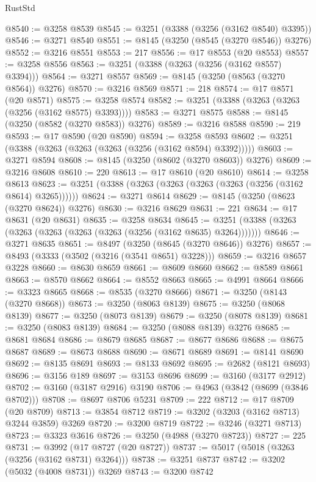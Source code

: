 \begin{lexlean}{RustStd}
\begin{coremodule}
@8540 := @3258 @8539
@8545 := @3251 (@3388 (@3256 (@3162 @8540) @3395))
@8546 := @3271 @8540
@8551 := @8145 (@3250 (@8545 (@3270 @8546)) @3276)
@8552 := @3216 @8551
@8553 := 217
@8556 := @17 @8553 (@20 @8553)
@8557 := @3258 @8556
@8563 := @3251 (@3388 (@3263 (@3256 (@3162 @8557) @3394)))
@8564 := @3271 @8557
@8569 := @8145 (@3250 (@8563 (@3270 @8564)) @3276)
@8570 := @3216 @8569
@8571 := 218
@8574 := @17 @8571 (@20 @8571)
@8575 := @3258 @8574
@8582 := @3251 (@3388 (@3263 (@3263 (@3256 (@3162 @8575) @3393))))
@8583 := @3271 @8575
@8588 := @8145 (@3250 (@8582 (@3270 @8583)) @3276)
@8589 := @3216 @8588
@8590 := 219
@8593 := @17 @8590 (@20 @8590)
@8594 := @3258 @8593
@8602 := @3251 (@3388 (@3263 (@3263 (@3263 (@3256 (@3162 @8594) @3392)))))
@8603 := @3271 @8594
@8608 := @8145 (@3250 (@8602 (@3270 @8603)) @3276)
@8609 := @3216 @8608
@8610 := 220
@8613 := @17 @8610 (@20 @8610)
@8614 := @3258 @8613
@8623 := @3251 (@3388 (@3263 (@3263 (@3263 (@3263 (@3256 (@3162 @8614) @3265))))))
@8624 := @3271 @8614
@8629 := @8145 (@3250 (@8623 (@3270 @8624)) @3276)
@8630 := @3216 @8629
@8631 := 221
@8634 := @17 @8631 (@20 @8631)
@8635 := @3258 @8634
@8645 := @3251 (@3388 (@3263 (@3263 (@3263 (@3263 (@3263 (@3256 (@3162 @8635) @3264)))))))
@8646 := @3271 @8635
@8651 := @8497 (@3250 (@8645 (@3270 @8646)) @3276)
@8657 := @8493 (@3333 (@3502 (@3216 (@3541 @8651) @3228)))
@8659 := @3216 @8657 @3228
@8660 := @8630 @8659
@8661 := @8609 @8660
@8662 := @8589 @8661
@8663 := @8570 @8662
@8664 := @8552 @8663
@8665 := @4991 @8664
@8666 := @3323 @8665
@8668 := @8535 (@3270 @8666)
@8671 := @3250 (@8143 (@3270 @8668))
@8673 := @3250 (@8063 @8139)
@8675 := @3250 (@8068 @8139)
@8677 := @3250 (@8073 @8139)
@8679 := @3250 (@8078 @8139)
@8681 := @3250 (@8083 @8139)
@8684 := @3250 (@8088 @8139) @3276
@8685 := @8681 @8684
@8686 := @8679 @8685
@8687 := @8677 @8686
@8688 := @8675 @8687
@8689 := @8673 @8688
@8690 := @8671 @8689
@8691 := @8141 @8690
@8692 := @8135 @8691
@8693 := @8133 @8692
@8695 := @2682 (@8121 @8693)
@8696 := @3156 @189
@8697 := @3153 @8696
@8699 := @3160 (@3177 @2912)
@8702 := @3160 (@3187 @2916) @3190
@8706 := @4963 (@3842 (@8699 (@3846 @8702)))
@8708 := @8697 @8706 @5231
@8709 := 222
@8712 := @17 @8709 (@20 @8709)
@8713 := @3854 @8712
@8719 := @3202 (@3203 (@3162 @8713) @3244 @3859) @3269
@8720 := @3200 @8719
@8722 := @3246 (@3271 @8713)
@8723 := @3323 @3616
@8726 := @3250 (@4988 (@3270 @8723))
@8727 := 225
@8731 := @3992 (@17 @8727 (@20 @8727))
@8737 := @5017 (@5018 (@3263 (@3256 (@3162 @8731) @3264)))
@8738 := @3251 @8737
@8742 := @3202 (@5032 (@4008 @8731)) @3269
@8743 := @3200 @8742

\end{coremodule}
\end{lexlean}
